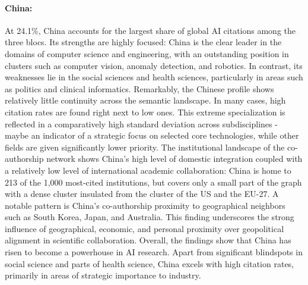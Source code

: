 \documentclass{article}
\begin{document}
	\paragraph{China:} At 24.1\%, China accounts for the largest share of global AI citations among the three blocs. Its strengths are highly focused: China is the clear leader in the domains of computer science and engineering, with an outstanding position in clusters such as computer vision, anomaly detection, and robotics. In contrast, its weaknesses lie in the social sciences and health sciences, particularly in areas such as politics and clinical informatics. Remarkably, the Chinese profile shows relatively little continuity across the semantic landscape. In many cases, high citation rates are found right next to low ones. This extreme specialization is reflected in a comparatively high standard deviation across subdisciplines - maybe an indicator of a strategic focus on selected core technologies, while other fields are given significantly lower priority. The institutional landscape of the co-authorship network shows China's high level of domestic integration coupled with a relatively low level of international academic collaboration: China is home to 213 of the 1,000 most-cited institutions, but covers only a small part of the graph with a dense cluster insulated from the cluster of the US and the EU-27. A notable pattern is China's co-authorship proximity to geographical neighbors such as South Korea, Japan, and Australia. This finding underscores the strong influence of geographical, economic, and personal proximity over geopolitical alignment in scientific collaboration. Overall, the findings show that China has risen to become a powerhouse in AI research. Apart from significant blindspots in social science and parts of health science, China excels with high citation rates, primarily in areas of strategic importance to industry.
	
	
\end{document}
